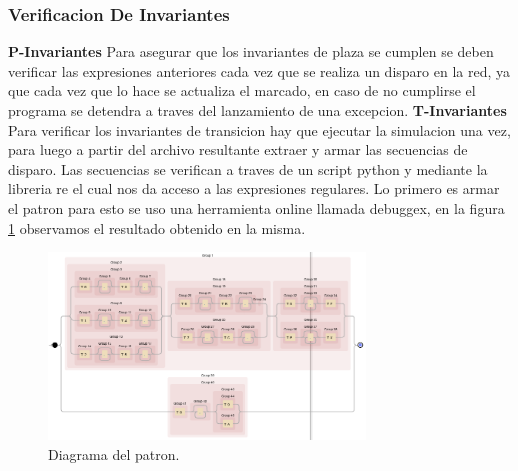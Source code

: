 \documentclass{article}
\begin{document}
		\subsubsection{Verificacion De Invariantes}
		\textbf{P-Invariantes} \newline
		Para asegurar que los invariantes de plaza se cumplen se deben verificar las 
		expresiones anteriores cada vez que se realiza un disparo en la red, ya que 
		cada vez que lo hace se actualiza el marcado, en caso de no cumplirse el programa
		se detendra a traves del lanzamiento de una excepcion.\newline
		\textbf{T-Invariantes} \newline
		Para verificar los invariantes de transicion hay que ejecutar la simulacion una vez, 
		para luego a partir del archivo resultante extraer y armar las secuencias de disparo.
		Las secuencias se verifican a traves de un script python y mediante la libreria re el cual nos da acceso a las expresiones regulares. Lo primero es armar el patron para esto se uso una herramienta online llamada debuggex, en la figura \ref{fig:mesh4} observamos el resultado obtenido en la misma.		 
		\begin{figure}[H]
			\centering
			\includegraphics[width=0.75\textwidth]{debuggex}
			\caption{Diagrama del patron.}
			\label{fig:mesh4}
		\end{figure}
\end{document}
